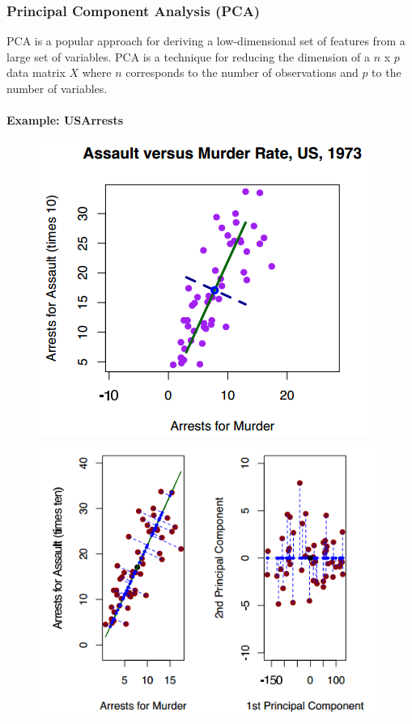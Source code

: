\subsubsection{Principal Component Analysis (PCA)}
{
PCA is a popular approach for deriving a low-dimensional set of features from a large set of variables. PCA is a technique for reducing the dimension of a $n$ x $p$ data matrix $X$ where $n$ corresponds to the number of observations and $p$ to the number of  variables.
\paragraph{Example: USArrests}
\begin{figure}[H]\centering
\begin{minipage}[c]{0.5\textwidth}
	\includegraphics[width=1\linewidth]{images/USArrests_PCA.png}
\end{minipage}\hfill
\begin{minipage}[c]{0.5\textwidth}
	\includegraphics[width=1\linewidth]{images/USArrests_PCA2.png}

\end{minipage}
\end{figure}}
